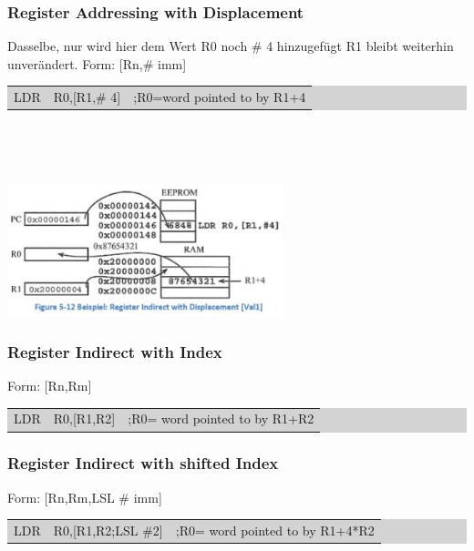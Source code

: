 \subsubsection{Register Addressing with Displacement}
\begin{minipage}[b]{10cm}
        Dasselbe, nur wird hier dem Wert R0 noch \# 4 hinzugefügt\newline
        R1 bleibt weiterhin unverändert.\newline
        Form: [Rn,\# imm]\newline
        \colorbox{lightgray}{
        \begin{tabular}{lll}
            LDR & R0,[R1,\# 4]&;R0=word pointed to by R1+4 \\ 
        \end{tabular} }\\
\end{minipage}
%
\begin{minipage}{0.5cm}
    	\-\
\end{minipage} 
%
\begin{minipage}{8cm}
    	\includegraphics[width=8cm]{images/AddressingDisplacment}    
\end{minipage}

\subsubsection{Register Indirect with Index}
Form: [Rn,Rm]\newline
\colorbox{lightgray}{
\begin{tabular}{lll}
   LDR &R0,[R1,R2]  &;R0= word pointed to by R1+R2 \\ 
\end{tabular} }

\subsubsection{Register Indirect with shifted Index}
Form: [Rn,Rm,LSL \# imm]\newline
\colorbox{lightgray}{
\begin{tabular}{lll}
    LDR&R0,[R1,R2;LSL \#2]  &;R0= word pointed to by R1+4*R2  \\ 
\end{tabular} }

